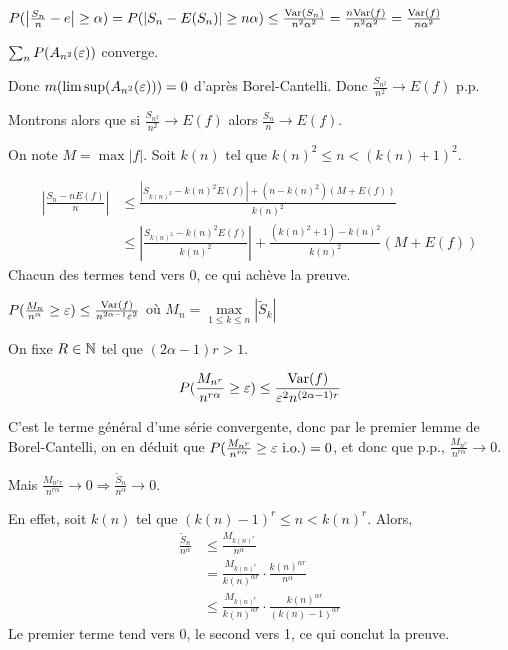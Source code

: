 \documentclass[10pt,a4paper,notitlepage ]{report}
\begin{document}
\begin{demo}
	
	$P(\left|\frac {S_n} n - e \right| \ge \alpha) = P(|S_n - E(S_n)| \ge n\alpha) \le \frac{\mathrm{Var}(S_n)}{n^2\alpha^2} = \frac{n \mathrm{Var}(f)}{n^2\alpha^2} = \frac{\mathrm{Var}(f)}{n\alpha^2}$
\end{demo}

\begin{demo}
	$\sum_n P(A_{n^2}(\varepsilon))$ converge.
	
	Donc $m(\limsup(A_{n^2}(\varepsilon)))= 0$ d'après Borel-Cantelli. Donc $\frac {S_{n^2}} {n^2} \rightarrow E(f)$ p.p.
	
	Montrons alors que si $\frac {S_{n^2}} {n^2} \rightarrow E(f)$ alors $\frac {S_n} n \rightarrow E(f)$.
	
	On note $M = \max |f|$. Soit $k(n)$ tel que $k(n)^2 \le n < (k(n) + 1)^2$.
	
	\begin{align*}
		\left| \frac{S_n - nE(f)} n \right| &\le \frac{|S_{k(n)^2} - k(n)^2E(f)| + (n-k(n)^2)(M+E(f))}{k(n)^2} \\
		&\le \left| \frac {S_{k(n)^2} - k(n)^2E(f)}{k(n)^2} \right| + \frac{(k(n)^2 +1) - k(n)^2}{k(n)^2} (M + E(f))
	\end{align*}
	Chacun des termes tend vers $0$, ce qui achève la preuve.
\end{demo}

\begin{demo}
	
	$P(\frac{M_n}{n^\alpha} \ge \varepsilon) \le \frac{\mathrm{Var}(f)}{n^{2\alpha -1}\varepsilon^2}$ où $M_n = \underset{1\le k \le n}\max |\tilde S_k|$
	
	On fixe $R\in\mathbb N$ tel que $(2\alpha -1)r > 1$.
	
	\[P(\frac{M_{n^r}}{n^{r\alpha}} \ge \varepsilon) \le \frac{\mathrm{Var}(f)}{\varepsilon^2 n^{(2\alpha - 1)r}}\]
	
	C'est le terme général d'une série convergente, donc par le premier lemme de Borel-Cantelli, on en déduit que $P(\frac{M_{n^r}}{n^{r\alpha}} \ge \varepsilon \text{ i.o.}) = 0$, et donc que p.p., $\frac{M_{n^r}}{n^{r\alpha}} \rightarrow 0$.
	
	Mais $\frac{M_{n^rr}}{n^{r\alpha}} \rightarrow 0 \Rightarrow \frac{\tilde S_n}{n^\alpha} \rightarrow 0$.
	
	En effet, soit $k(n)$ tel que $(k(n) -1)^r \le n < k(n)^r$. Alors,
	\begin{align*}
		\frac{\tilde S_n}{n^\alpha} &\le \frac{M_{k(n)^r}}{n^\alpha} \\
		& = \frac{M_{k(n)^r}}{k(n)^{\alpha r}} \cdot \frac{k(n)^{\alpha r}}{n^\alpha} \\
		&\le \frac{M_{k(n)^r}}{k(n)^{\alpha r}} \cdot \frac{k(n)^{\alpha r}}{(k(n) -1)^{\alpha r}}
	\end{align*}
	Le premier terme tend vers 0, le second vers 1, ce qui conclut la preuve.
\end{demo}
\end{document}
